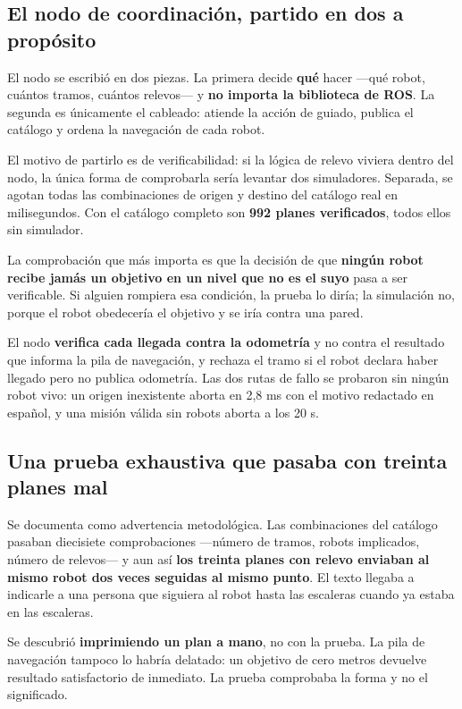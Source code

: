 \documentclass[12pt,letterpaper]{article}
\begin{document}
\subsection{El nodo de coordinación, partido en dos a propósito}

El nodo se escribió en dos piezas. La primera decide \textbf{qué} hacer ---qué robot, cuántos tramos, cuántos relevos--- y \textbf{no importa la biblioteca de ROS}. La segunda es únicamente el cableado: atiende la acción de guiado, publica el catálogo y ordena la navegación de cada robot.

El motivo de partirlo es de verificabilidad: si la lógica de relevo viviera dentro del nodo, la única forma de comprobarla sería levantar dos simuladores. Separada, se agotan todas las combinaciones de origen y destino del catálogo real en milisegundos. Con el catálogo completo son \textbf{992 planes verificados}, todos ellos sin simulador.

La comprobación que más importa es que la decisión de que \textbf{ningún robot recibe jamás un objetivo en un nivel que no es el suyo} pasa a ser verificable. Si alguien rompiera esa condición, la prueba lo diría; la simulación no, porque el robot obedecería el objetivo y se iría contra una pared.

El nodo \textbf{verifica cada llegada contra la odometría} y no contra el resultado que informa la pila de navegación, y rechaza el tramo si el robot declara haber llegado pero no publica odometría. Las dos rutas de fallo se probaron sin ningún robot vivo: un origen inexistente aborta en 2,8 ms con el motivo redactado en español, y una misión válida sin robots aborta a los 20 s.

\subsection{Una prueba exhaustiva que pasaba con treinta planes mal}

Se documenta como advertencia metodológica. Las combinaciones del catálogo pasaban diecisiete comprobaciones ---número de tramos, robots implicados, número de relevos--- y aun así \textbf{los treinta planes con relevo enviaban al mismo robot dos veces seguidas al mismo punto}. El texto llegaba a indicarle a una persona que siguiera al robot hasta las escaleras cuando ya estaba en las escaleras.

Se descubrió \textbf{imprimiendo un plan a mano}, no con la prueba. La pila de navegación tampoco lo habría delatado: un objetivo de cero metros devuelve resultado satisfactorio de inmediato. La prueba comprobaba la forma y no el significado.
\end{document}
